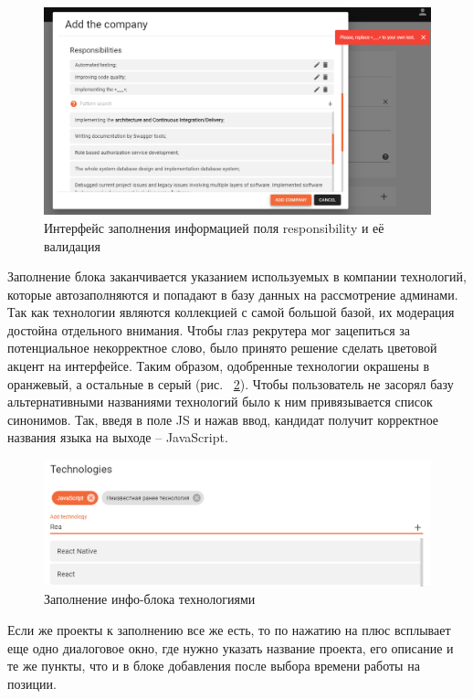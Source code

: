 \documentclass[12pt, a4paper]{diplom}
\begin{document}
\begin{figure}[!ht]
\centering
\includegraphics[width=1\textwidth]{resources/responsibility.png}
\caption{Интерфейс заполнения информацией поля responsibility и её валидация}
\label{11}
\end{figure}

Заполнение блока заканчивается указанием используемых в компании технологий, которые автозаполняются и попадают в базу данных на рассмотрение админами.
Так как технологии являются коллекцией с самой большой базой, их модерация достойна отдельного внимания. Чтобы глаз рекрутера мог зацепиться за потенциальное некорректное слово, было принято решение
сделать цветовой акцент на интерфейсе. Таким образом, одобренные технологии окрашены в оранжевый, а остальные в серый (рис. ~\ref{12}). Чтобы пользователь не засорял базу альтернативными названиями технологий было к ним привязывается список синонимов. Так, введя в поле JS и нажав ввод,
кандидат получит корректное названия языка на выходе -- JavaScript.

\begin{figure}[!ht]
	\centering
	\includegraphics[width=1\textwidth]{resources/technologies.png}
	\caption{Заполнение инфо-блока технологиями}
	\label{12}
\end{figure}

Если же проекты к заполнению все же есть, то по нажатию на плюс всплывает еще одно диалоговое окно, где нужно
указать название проекта, его описание и те же пункты, что и в блоке добавления после выбора времени работы на позиции.
\end{document}
